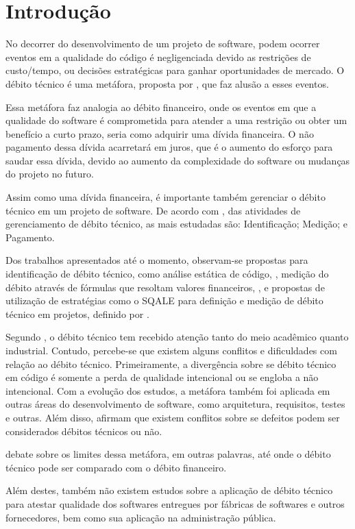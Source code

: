 \chapter[Introdução]{Introdução}

No decorrer do desenvolvimento de um projeto de software, podem ocorrer eventos
em a qualidade do código é negligenciada devido as restrições de custo/tempo,
ou decisões estratégicas para ganhar oportunidades de mercado. O débito técnico
é uma metáfora, proposta por \cite{cunningham}, que faz alusão a esses eventos.

Essa metáfora faz analogia ao débito financeiro, onde os eventos em que a
qualidade do software é comprometida para atender a uma restrição ou obter
um benefício a curto prazo, seria como adquirir uma dívida financeira. O não
pagamento dessa dívida acarretará em juros, que é o aumento do esforço para
saudar essa dívida, devido ao aumento da complexidade do software ou mudanças
do projeto no futuro.

Assim como uma dívida financeira, é importante também gerenciar o débito técnico
em um projeto de software. De acordo com \cite{mapping}, das atividades de
gerenciamento de débito técnico, as mais estudadas são: Identificação; Medição;
e Pagamento.

Dos trabalhos apresentados até o momento, observam-se propostas para identificação de
débito técnico, como análise estática de código, \cite{siebra}, medição do débito
através de fórmulas que resoltam valores financeiros, \cite{principal}, e
propostas de utilização de estratégias como o SQALE para definição e medição de
débito técnico em projetos, definido por \cite{letouzey}.

Segundo \cite{mapping}, o débito técnico tem recebido atenção tanto do meio
acadêmico quanto industrial. Contudo, percebe-se que existem alguns conflitos e
dificuldades com relação ao débito técnico. Primeiramente, a divergência sobre
se débito técnico em código é somente a perda de qualidade intencional ou se
engloba a não intencional. Com a evolução dos estudos, a metáfora também foi
aplicada em outras áreas do desenvolvimento de software, como arquitetura,
requisitos, testes e outras. Além disso, \cite{mapping} afirmam que existem
conflitos sobre se defeitos podem ser considerados débitos técnicos ou não.

\cite{schmid} debate sobre os limites dessa metáfora, em outras palavras, até onde
o débito técnico pode ser comparado com o débito financeiro.

Além destes, também não existem estudos sobre a aplicação de débito técnico para
atestar qualidade dos softwares entregues por fábricas de softwares e outros
fornecedores, bem como sua aplicação na administração pública.


